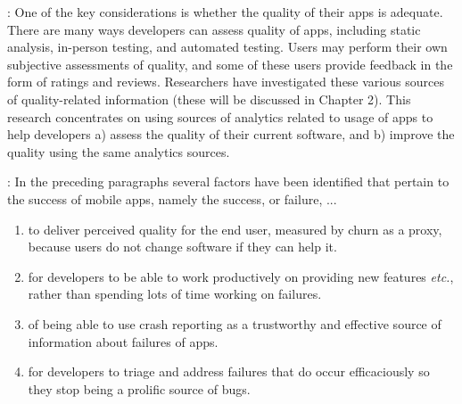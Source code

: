 
\medskip
{}: One of the key considerations is whether the quality of their apps is adequate. There are many ways developers can assess quality of apps, including static analysis, in-person testing, and automated testing. Users may perform their own subjective assessments of quality, and some of these users provide feedback in the form of ratings and reviews. Researchers have investigated these various sources of quality-related information (these will be discussed in Chapter 2). This research concentrates on using sources of analytics related to usage of apps to help developers a) assess the quality of their current software, and b) improve the quality using the same analytics sources.


\medskip
{}: %
In the preceding paragraphs several factors have been identified that pertain to the success of mobile apps, namely the success, or failure, ...
\begin{enumerate}
    \item to deliver perceived quality for the end user, measured by churn as a proxy, because users do not change software if they can help it. %
    \item for developers to be able to work productively on providing new features \emph{etc.}, rather than spending lots of time working on failures.
    \item of being able to use crash reporting as a trustworthy and effective source of information about failures of apps.
    \item for developers to triage and address failures that do occur efficaciously so they stop being a prolific source of bugs.
\end{enumerate}

